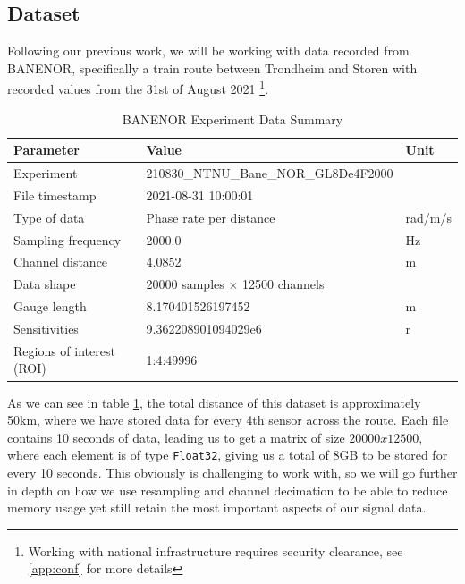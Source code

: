 \subsection{Dataset}

Following our previous work, we will be working with data recorded from BANENOR, specifically a train route between Trondheim and Storen with recorded values from the 31st of August 2021 \footnote{Working with national infrastructure requires security clearance, see \ref{app:conf} for more details}. 

\begin{table}[htbp]
    \centering
    \small
    \begin{tabular}{@{}p{}p{}p{}@{}}
        \toprule
        \textbf{Parameter} & \textbf{Value} & \textbf{Unit} \\
        \midrule
        Experiment & 210830\_NTNU\_Bane\_NOR\_GL8De4F2000 & \\
        File timestamp & 2021-08-31 10:00:01 & \\
        Type of data & Phase rate per distance & rad/m/s \\
        Sampling frequency & 2000.0 & \si{\hertz} \\
        Channel distance & 4.0852 & \si{\meter} \\
        \midrule
        Data shape & 20000 samples \(\times\) 12500 channels & \\
        \midrule
        Gauge length & 8.170401526197452 & \si{\meter} \\
        Sensitivities & 9.362208901094029e6 & r \\
        Regions of interest (ROI) & 1:4:49996 & \\
        \bottomrule
    \end{tabular}
    \caption{BANENOR Experiment Data Summary}
    \label{tab:experiment_data}
\end{table}

As we can see in table \ref{tab:experiment_data}, the total distance of this dataset is approximately 50km, where we have stored data for every 4th sensor across the route. Each file contains 10 seconds of data, leading us to get a matrix of size $20000 x 12500$, where each element is of type \texttt{Float32}, giving us a total of 8GB to be stored for every 10 seconds. This obviously is challenging to work with, so we will go further in depth on how we use resampling and channel decimation to be able to reduce memory usage yet still retain the most important aspects of our signal data. \\


